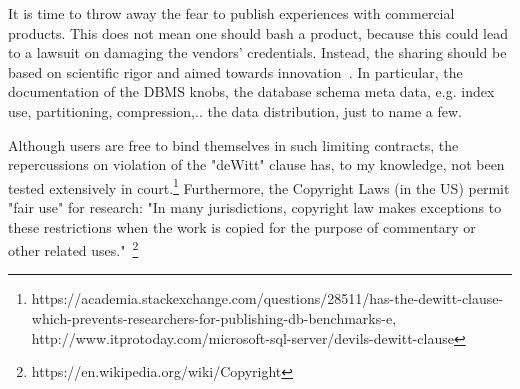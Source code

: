 \documentclass{cidr-2019}
\begin{document}
%
%
It is time to throw away the fear to publish experiences with commercial products.
This does not mean one should bash a product, because this
could lead to a lawsuit on damaging the vendors' credentials.
Instead, the sharing should be based on scientific rigor and aimed towards innovation~\cite{DBLP:conf/sigmod/RaasveldtHGM18}.
In particular, the documentation of the DBMS knobs, the database schema meta data, e.g. index use, partitioning, compression,.. the data distribution, just to name a few.

Although users are free to bind themselves in such limiting contracts, the repercussions on violation of the "deWitt" clause has, to my knowledge, not been tested extensively in court.\footnote{https://academia.stackexchange.com/questions/28511/has-the-dewitt-clause-which-prevents-researchers-for-publishing-db-benchmarks-e, http://www.itprotoday.com/microsoft-sql-server/devils-dewitt-clause}
Furthermore, the Copyright Laws (in the US) permit "fair use" for research:  
"In many jurisdictions, copyright law makes exceptions to these restrictions when the work is copied for the purpose of commentary or other related uses."~\footnote{https://en.wikipedia.org/wiki/Copyright}
\end{document}
